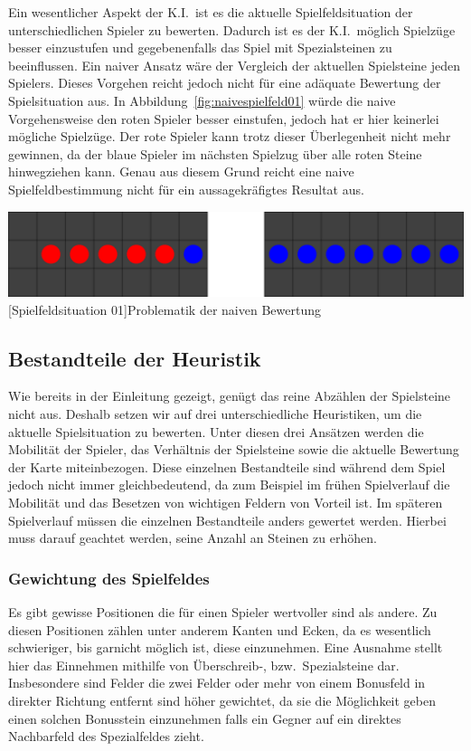 Ein wesentlicher Aspekt der K.I.\ ist es die aktuelle Spielfeldsituation der unterschiedlichen Spieler zu bewerten.
Dadurch ist es der K.I.\ m\"oglich Spielz\"uge besser einzustufen und gegebenenfalls das Spiel mit Spezialsteinen zu beeinflussen.
Ein naiver Ansatz w\"are der Vergleich der aktuellen Spielsteine jeden Spielers.
Dieses Vorgehen reicht jedoch nicht f\"ur eine ad\"aquate Bewertung der Spielsituation aus.
In Abbildung~\ref{fig:naivespielfeld01} w\"urde die naive Vorgehensweise den roten Spieler besser einstufen, jedoch hat er hier keinerlei m\"ogliche Spielz\"uge.
Der rote Spieler kann trotz dieser \"Uberlegenheit nicht mehr gewinnen, da der blaue Spieler im n\"achsten Spielzug \"uber alle roten Steine hinwegziehen kann.
Genau aus diesem Grund reicht eine naive Spielfeldbestimmung nicht f\"ur ein aussagekr\"afigtes Resultat aus.

\vspace{1em}
\begin{minipage}{\linewidth}
    \centering
    \includegraphics[width=0.6\linewidth]{pics/naive-game-situation}
    [Spielfeldsituation 01]{Problematik der naiven Bewertung}
    \label{fig:naivespielfeld01}
\end{minipage}

\subsection{Bestandteile der Heuristik}\label{subsec:bestandteile-der-heuristik}
Wie bereits in der Einleitung gezeigt, gen\"ugt das reine Abz\"ahlen der Spielsteine nicht aus.
Deshalb setzen wir auf drei unterschiedliche Heuristiken, um die aktuelle Spielsituation zu bewerten.
Unter diesen drei Ans\"atzen werden die Mobilit\"at der Spieler, das Verh\"altnis der Spielsteine sowie die aktuelle Bewertung der Karte miteinbezogen.
Diese einzelnen Bestandteile sind w\"ahrend dem Spiel jedoch nicht immer gleichbedeutend, da zum Beispiel im fr\"uhen Spielverlauf die Mobilit\"at und das Besetzen von wichtigen Feldern von Vorteil ist.
Im sp\"ateren Spielverlauf m\"ussen die einzelnen Bestandteile anders gewertet werden.
Hierbei muss darauf geachtet werden, seine Anzahl an Steinen zu erh\"ohen.

\subsubsection{Gewichtung des Spielfeldes}
Es gibt gewisse Positionen die f\"ur einen Spieler wertvoller sind als andere.
Zu diesen Positionen z\"ahlen unter anderem Kanten und Ecken, da es wesentlich schwieriger, bis garnicht m\"oglich ist, diese einzunehmen.
Eine Ausnahme stellt hier das Einnehmen mithilfe von \"Uberschreib-, bzw.\ Spezialsteine dar.
Insbesondere sind Felder die zwei Felder oder mehr von einem Bonusfeld in direkter Richtung entfernt sind h\"oher gewichtet, da sie die M\"oglichkeit geben einen solchen Bonusstein einzunehmen falls ein Gegner auf ein direktes Nachbarfeld des Spezialfeldes zieht.

